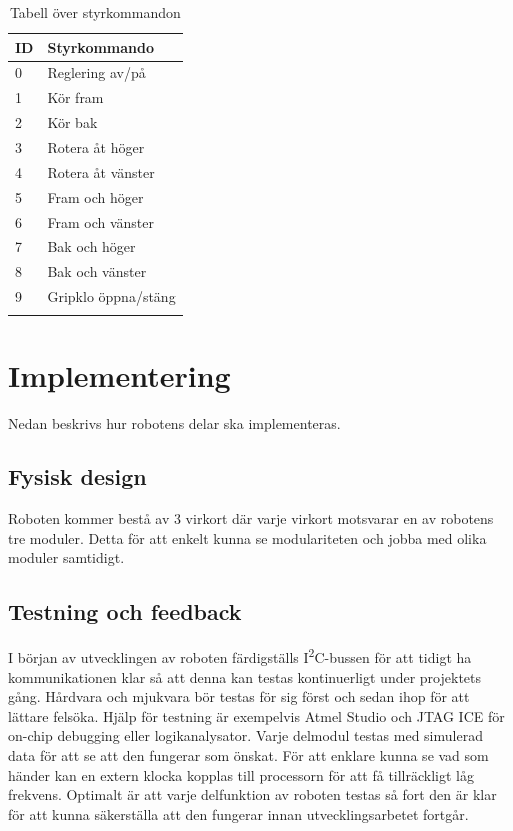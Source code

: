\documentclass[11pt]{article}
\begin{document}
\begin{flushleft}
\begin{longtable}[l]{| l | l |} \hline
\textbf{ID} & \textbf{Styrkommando} \\ \hline 
0 & Reglering av/på \\ \hline
1 & Kör fram \\ \hline
2 & Kör bak \\ \hline
3 & Rotera åt höger \\ \hline
4 & Rotera åt vänster \\ \hline
5 & Fram och höger \\ \hline
6 & Fram och vänster \\ \hline
7 & Bak och höger \\ \hline
8 & Bak och vänster \\ \hline
9 & Gripklo öppna/stäng \\ \hline

\caption{Tabell över styrkommandon}\label{styrtab}
\end{longtable}

\pagebreak
\section{Implementering}
Nedan beskrivs hur robotens delar ska implementeras. 


\subsection{Fysisk design}
Roboten kommer bestå av 3 virkort där varje virkort motsvarar en av robotens tre moduler. Detta för att enkelt kunna se modulariteten och jobba med olika moduler samtidigt.

\subsection{Testning och feedback}
I början av utvecklingen av roboten färdigställs I\textsuperscript{2}C-bussen för att tidigt ha kommunikationen klar så att denna kan testas kontinuerligt under projektets gång. Hårdvara och mjukvara bör testas för sig först och sedan ihop för att lättare felsöka. Hjälp för testning är exempelvis Atmel Studio och JTAG ICE för on-chip debugging eller logikanalysator. Varje delmodul testas med simulerad data för att se att den fungerar som önskat. För att enklare kunna se vad som händer kan en extern klocka kopplas till processorn för att få tillräckligt låg frekvens. Optimalt är att varje delfunktion av roboten testas så fort den är klar för att kunna säkerställa att den fungerar innan utvecklingsarbetet fortgår.  


\end{flushleft}
\end{document}
